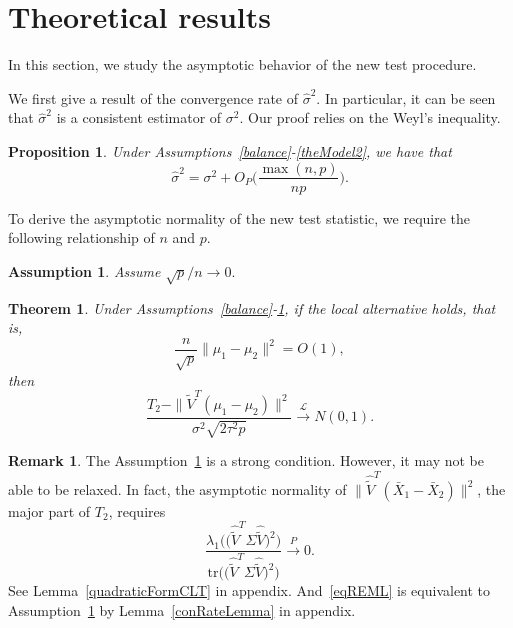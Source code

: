 \documentclass[review]{elsarticle}
\theoremstyle{plain}
\newtheorem{theorem}{\quad\quad Theorem}
\newtheorem{proposition}{\quad\quad Proposition}
\newtheorem{assumption}{\quad\quad Assumption}
\theoremstyle{definition}
\newtheorem{remark}{\quad\quad Remark}
\theoremstyle{remark}
\begin{document}
\section{Theoretical results}

In this section, we study the asymptotic behavior of the new test procedure.


 We first give a result of the convergence rate of $\hat{\sigma}^2$.
 In particular, it can be seen that $\hat{\sigma}^2$ is a consistent estimator of $\sigma^2$.   
 Our proof relies on the Weyl's inequality.
\begin{proposition}\label{varianceEstimation}
    Under Assumptions~\ref{balance}-\ref{theModel2}, we have that%
    $$
    \hat{\sigma}^2=\sigma^2 + O_P\Big(\frac{\max (n,p)}{np}\Big).
    $$
\end{proposition}

To derive the asymptotic normality of the new test statistic, we require the following relationship of $n$ and $p$.
\begin{assumption}\label{pAndN}
    Assume
    $
    {\sqrt{p}}/{n}\to 0.
    $
\end{assumption}

 


\begin{theorem}\label{myPanpan}
    Under Assumptions~\ref{balance}-\ref{pAndN},
if the local alternative holds, that is,
    $$\frac{n}{\sqrt{p}}\|\mu_1-\mu_2\|^2=O(1),$$
then 
\begin{equation*}
        \frac{T_2-\|\tilde{V}^T(\mu_1-\mu_2)\|^2}{\sigma^2\sqrt{2\tau^2 p}}\xrightarrow{\mathcal{L}}N(0,1).
\end{equation*}
\end{theorem} 
\begin{remark}
The Assumption~\ref{pAndN} is a strong condition.
However, it may not be able to be relaxed. In fact, the asymptotic normality of $\|\hat{\tilde{V}}^T(\bar{X}_1-\bar{X}_2)\|^2$, the major part of $T_2$, requires 
\begin{equation}\label{eqREML}
    \frac{\lambda_1\big(\big(\hat{\tilde{V}}^T \Sigma \hat{\tilde{V}}\big)^2\big)}{\mathrm{tr}\big(\big(\hat{\tilde{V}}^T \Sigma \hat{\tilde{V}}\big)^2\big)
}\xrightarrow{P} 0.
\end{equation}
See Lemma~\ref{quadraticFormCLT} in appendix. And~\eqref{eqREML} is equivalent to Assumption~\ref{pAndN} by Lemma~\ref{conRateLemma} in appendix.
\end{remark}
\end{document}
